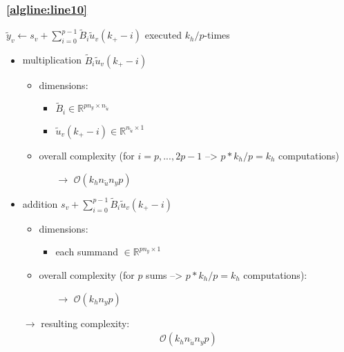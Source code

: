 \documentclass{article}
\begin{document}
\subsubsection{\cref{algline:line10}} 
$\tilde{y}_v \gets s_v + \sum_{i=0}^{p-1}  \tilde{B}_{i} \tilde{u}_v(k_+-i)$
executed $k_h/p$-times
\begin{itemize}
    \item multiplication $\tilde{B}_{i} \tilde{u}_v(k_+-i)$
    \begin{itemize}
        \item dimensions:
        \begin{itemize}
            \item $\tilde{B}_{i} \in \mathbb{R}^{pn_y \times n_{\tilde{u}}}$
            \item $\tilde{u}_v(k_+-i) \in \mathbb{R}^{n_{\tilde{u}} \times 1}$
        \end{itemize}
        \item overall complexity (for $i=p,...,2p-1$ --> $p*k_h/p=k_h$ computations)
        \begin{itemize}
            \item[$\rightarrow$] $\mathcal{O}(k_h n_{\tilde{u}} n_y p)$
        \end{itemize}
    \end{itemize}
    \item addition $s_v + \sum_{i=0}^{p-1}  \tilde{B}_{i} \tilde{u}_v(k_+-i)$
    \begin{itemize}
        \item dimensions:
        \begin{itemize}
            \item each summand $\in \mathbb{R}^{pn_y \times 1}$
        \end{itemize}
        \item overall complexity (for $p$ sums --> $p*k_h/p=k_h$ computations):%
        \begin{itemize}
            \item[$\rightarrow$] $\mathcal{O}(k_h n_y p)$
        \end{itemize}
    \end{itemize}    
    \item[$\rightarrow$] resulting complexity: \begin{align*}
        \mathcal{O}(k_h n_{\tilde{u}} n_y p)
    \end{align*}
\end{itemize}
\end{document}
